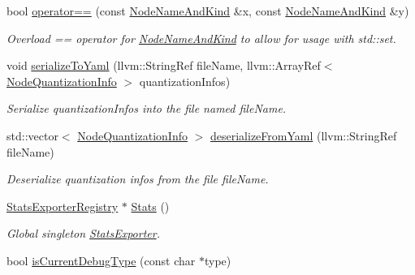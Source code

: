 \begin{DoxyCompactItemize}
bool \hyperlink{namespaceglow_a3bb55fda5495f592ea57c2a223c4e0a7}{operator==} (const \hyperlink{structglow_1_1_node_name_and_kind}{Node\+Name\+And\+Kind} \&x, const \hyperlink{structglow_1_1_node_name_and_kind}{Node\+Name\+And\+Kind} \&y)
\begin{DoxyCompactList}\small\item\em Overload == operator for \hyperlink{structglow_1_1_node_name_and_kind}{Node\+Name\+And\+Kind} to allow for usage with std\+::set. \end{DoxyCompactList}\item 
\mbox{\label{namespaceglow_a5c38c04977c3b94eec8b306c5a01bea1}} 
void \hyperlink{namespaceglow_a5c38c04977c3b94eec8b306c5a01bea1}{serialize\+To\+Yaml} (llvm\+::\+String\+Ref file\+Name, llvm\+::\+Array\+Ref$<$ \hyperlink{structglow_1_1_node_quantization_info}{Node\+Quantization\+Info} $>$ quantization\+Infos)
\begin{DoxyCompactList}\small\item\em Serialize {\ttfamily quantization\+Infos} into the file named {\ttfamily file\+Name}. \end{DoxyCompactList}\item 
\mbox{\label{namespaceglow_a40c0a9d395ccc24594fbc8935d24fd0d}} 
std\+::vector$<$ \hyperlink{structglow_1_1_node_quantization_info}{Node\+Quantization\+Info} $>$ \hyperlink{namespaceglow_a40c0a9d395ccc24594fbc8935d24fd0d}{deserialize\+From\+Yaml} (llvm\+::\+String\+Ref file\+Name)
\begin{DoxyCompactList}\small\item\em Deserialize quantization infos from the file {\ttfamily file\+Name}. \end{DoxyCompactList}\item 
\mbox{\label{namespaceglow_aba68dabd93fccc2d7c95db1688338f48}} 
\hyperlink{classglow_1_1_stats_exporter_registry}{Stats\+Exporter\+Registry} $\ast$ \hyperlink{namespaceglow_aba68dabd93fccc2d7c95db1688338f48}{Stats} ()
\begin{DoxyCompactList}\small\item\em Global singleton \hyperlink{classglow_1_1_stats_exporter}{Stats\+Exporter}. \end{DoxyCompactList}\item 
bool \hyperlink{namespaceglow_a5192591d333ee1a71b03325bb3d9f80a}{is\+Current\+Debug\+Type} (const char $\ast$type)

\end{DoxyCompactItemize}
